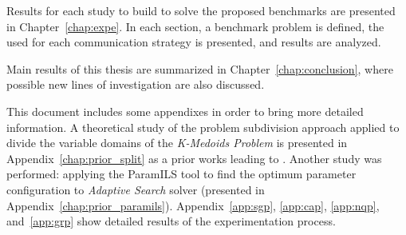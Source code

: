 Results for each study to build \posl{} \comstrs{} to solve the proposed benchmarks are presented in Chapter~\ref{chap:expe}. In each section, a benchmark problem is defined, the used \soset{} for each communication strategy is presented, and results are analyzed. %

Main results of this thesis are summarized in Chapter~\ref{chap:conclusion}, where possible new lines of investigation are also discussed.

This document includes some appendixes in order to bring more detailed information. A theoretical study of the problem subdivision approach applied to divide the variable domains of the \textit{K-Medoids Problem} is presented in Appendix~\ref{chap:prior_split} as a prior works leading to \posl{}. Another study was performed: applying the {\sc ParamILS} tool to find the optimum parameter configuration to \textit{Adaptive Search} solver (presented in Appendix~\ref{chap:prior_paramils}). Appendix~\ref{app:sgp}, \ref{app:cap}, \ref{app:nqp}, and~\ref{app:grp} show detailed results of the experimentation process.